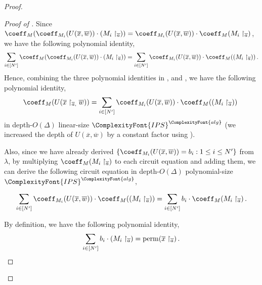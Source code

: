 \documentclass[11pt,letter]{article}
\theoremstyle{remark} %
\newcommand{\perm}{{\rm perm}}
\newcommand{\alg}{\ComplexityFont{alg}}
\newcommand{\IPS}{%
    {
        \ComplexityFont{IPS} 
    }
}
\begin{document}
{\begin{proof}
\begin{proof}[Proof of ]
    Since $\coeff_M(\coeff_{M_i}(U(\overline{x}, \overline{w})) \cdot (M_i\restriction_{\overline{a}})) = \coeff_{M_i}(U(\overline{x}, \overline{w})) \cdot \coeff_M(M_i\restriction_{\overline{a}})$, we have the following polynomial identity,
        \begin{equation}
            \label{equa: coefficient for subcircuits in disjoint variables}
            \sum_{i\in [N^\prime]} \coeff_M(\coeff_{M_i}(U(\overline{x}, \overline{w})) \cdot (M_i\restriction_{\overline{a}})) = \sum_{i\in [N^\prime]} \coeff_{M_i}(U(\overline{x}, \overline{w})) \cdot \coeff_M( (M_i\restriction_{\overline{a}}))\,.
        \end{equation}
        Hence, combining the three polynomial identities in ,  and , we have the following polynomial identity,
        \begin{equation}
            \label{equa: first polynomial identity in IPS}
            \coeff_M( U(\overline{x}\restriction_{\overline{a},} \overline{w})) = \sum_{i\in [N^\prime]} \coeff_{M_i}(U(\overline{x}, \overline{w})) \cdot \coeff_M( (M_i\restriction_{\overline{a}}))\
        \end{equation}
        in depth-$O(\Delta)$ linear-size $\IPS^\alg$ (we increased the depth of $U(\overline{x}, \overline{w})$ by a constant factor using ). 
        
        \bigskip
        
        Also, since we have already derived $\{\coeff_{M_i} (U(\overline{x},\overline{w})) = b_i : 1\leq i \leq N^\prime\}$ from $\lambda$, by multiplying $\coeff_M(M_i\restriction_{\overline{a}})$ to each circuit equation and adding them, we can derive the following circuit equation in depth-$O(\Delta)$ polynomial-size $\IPS^\alg$,
        
        
        \begin{equation}
            \label{equa: second polynomial in IPS}
            \sum_{i\in [N^\prime]} \coeff_{M_i}(U(\overline{x}, \overline{w})) \cdot \coeff_M( (M_i\restriction_{\overline{a}})) = \sum_{i \in [N^\prime]} b_i \cdot \coeff_M(M_i\restriction_{\overline{a}})\,.
        \end{equation}

        \bigskip

        By definition, we have the following polynomial identity,
        \begin{equation}
            \label{equa: perm identity}
            \sum_{i\in [N^\prime]} b_i \cdot (M_i\restriction_{\overline{a}}) = \perm(\overline{x}\restriction_{\overline{a}})\,.
        \end{equation}
        

\end{proof}
\end{proof}}
\end{document}
